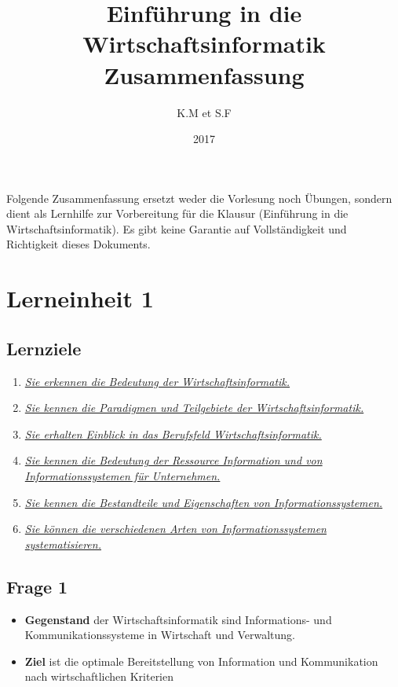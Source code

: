 \documentclass[a4paper]{article}
\title{Einführung in die Wirtschaftsinformatik Zusammenfassung}
\author{K.M et S.F}
\date{2017}
\newenvironment{checkit}{%
\begin{lrbox}{\definitionbox}
\begin{minipage}[t]{0.85\textwidth}%
}%
{\end{minipage}\end{lrbox}%
\begin{center}{\colorbox{checkcolor}{\usebox{\definitionbox}}}%
\end{center}}
\begin{document}
\maketitle

\sloppy
\begin{checkit}
Folgende Zusammenfassung ersetzt weder die Vorlesung noch Übungen, sondern dient als Lernhilfe zur Vorbereitung für die Klausur (Einführung in die Wirtschaftsinformatik). Es gibt keine Garantie auf Vollständigkeit und Richtigkeit dieses Dokuments.
\end{checkit}

\section*{Lerneinheit 1}
\subsection*{Lernziele}
\begin{enumerate}
	\item \hyperref[le1-1]{\textit{Sie erkennen die Bedeutung der Wirtschaftsinformatik.}}
	\item \hyperref[le1-2]{\textit{Sie kennen die Paradigmen und Teilgebiete der Wirtschaftsinformatik.}}
	\item \hyperref[le1-3]{\textit{Sie erhalten Einblick in das Berufsfeld Wirtschaftsinformatik.}}
	\item \hyperref[le1-4]{\textit{Sie kennen die Bedeutung der Ressource Information und von Informationssystemen für Unternehmen.}}
	\item \hyperref[le1-5]{\textit{Sie kennen die Bestandteile und Eigenschaften von Informationssystemen.}}
	\item \hyperref[le1-6]{\textit{Sie können die verschiedenen Arten von Informationssystemen systematisieren.}}
\end{enumerate}

\subsection*{Frage 1}
\label{le1-1}
\begin{itemize}
	\item \textbf{Gegenstand} der Wirtschaftsinformatik sind Informations- und Kommunikationssysteme in Wirtschaft und Verwaltung.
	\item \textbf{Ziel} ist die optimale Bereitstellung von Information und Kommunikation nach wirtschaftlichen Kriterien
\end{itemize}
\end{document}
